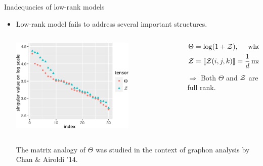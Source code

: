 \documentclass[10pt, mathserif]{beamer} %
\theoremstyle{definition}
\theoremstyle{plain}
\begin{document}
\begin{frame}{Inadequacies of  low-rank models}
\begin{itemize}
 \item Low-rank model fails to address several important structures.
 \begin{columns}
\begin{column}{0.55\textwidth}
   \begin{center}
     \includegraphics[width=0.7\textwidth]{Figures/example2.pdf}
     \end{center}
\end{column}
\begin{column}{0.6\textwidth}  
\begin{align}\Theta &= \log(1+\mathcal{Z}),\quad\text{ where }\\
\mathcal{Z}&=\llbracket \mathcal{Z}(i,j,k) \rrbracket  = \frac{1}{d}\max(i,j,k). \text{ }\hspace{1cm} 
\end{align}
$\Rightarrow$ Both $\Theta$ and $\mathcal{Z}$ are full rank. 
\end{column}
\end{columns}
    
{\tiny \hfill The matrix analogy of $\Theta$ was studied in the context of graphon analysis by Chan \& Airoldi '14.}
 \end{itemize}
\end{frame}
\end{document}
